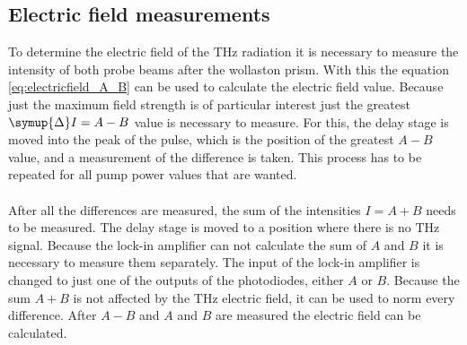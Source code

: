 \subsection{Electric field measurements}
\label{sec:field}
To determine the electric field of the $\si{\tera\hertz}$ radiation it is necessary to measure the intensity of both probe beams after the wollaston prism.
With this the equation \eqref{eq:electricfield_A_B} can be used to calculate the electric field value.
Because just the maximum field strength is of particular interest just the greatest $\symup{\Delta}I = A-B$ value is necessary to measure.
For this, the delay stage is moved into the peak of the pulse, which is the position of the greatest $A-B$ value, and a measurement of the difference is taken.
This process has to be repeated for all pump power values that are wanted.
\\\\
After all the differences are measured, the sum of the intensities $I = A + B$ needs to be measured.
The delay stage is moved to a position where there is no $\si{\tera\hertz}$ signal.
Because the lock-in amplifier can not calculate the sum of $A$ and $B$ it is necessary to measure them separately.
The input of the lock-in amplifier is changed to just one of the outputs of the photodiodes, either $A$ or $B$.
Because the sum $A+B$ is not affected by the $\si{\tera\hertz}$ electric field, it can be used to norm every difference.
After $A-B$ and $A$ and $B$ are measured the electric field can be calculated.
